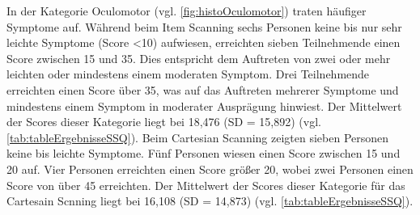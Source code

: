 In der Kategorie Oculomotor (vgl. \autoref{fig:histoOculomotor}) traten häufiger Symptome auf. Während beim Item Scanning sechs Personen keine bis nur sehr leichte Symptome (Score <10) aufwiesen, erreichten sieben Teilnehmende einen Score zwischen 15 und 35. Dies entspricht dem Auftreten von zwei oder mehr leichten oder mindestens einem moderaten Symptom. Drei Teilnehmende erreichten einen Score über 35, was auf das Auftreten mehrerer Symptome und mindestens einem Symptom in moderater Ausprägung hinwiest. Der Mittelwert der Scores dieser Kategorie liegt bei 18,476 (SD = 15,892) (vgl. \autoref{tab:tableErgebnisseSSQ}). Beim Cartesian Scanning zeigten sieben Personen keine bis leichte Symptome. Fünf Personen wiesen einen Score zwischen 15 und 20 auf. Vier Personen erreichten einen Score größer 20, wobei zwei Personen einen Score von über 45 erreichten. Der Mittelwert der Scores dieser Kategorie für das Cartesain Scnning liegt bei 16,108 (SD = 14,873) (vgl. \autoref{tab:tableErgebnisseSSQ}).

